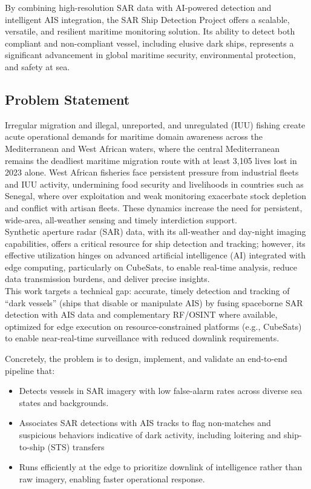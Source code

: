 \documentclass{article}
\begin{document}
	By combining high-resolution SAR data with AI-powered detection and intelligent AIS integration, the SAR Ship Detection Project offers a scalable, versatile, and resilient maritime monitoring solution. Its ability to detect both compliant and non-compliant vessel, including elusive dark ships, represents a significant advancement in global maritime security, environmental protection, and safety at sea.
	
	
	\subsection{Problem Statement}
	
	Irregular migration and illegal, unreported, and unregulated (IUU) fishing create acute operational demands for maritime domain awareness across the Mediterranean and West African waters, where the central Mediterranean remains the deadliest maritime migration route with at least 3,105 lives lost in 2023 alone. West African fisheries face persistent pressure from industrial fleets and IUU activity, undermining food security and livelihoods in countries such as Senegal, where over exploitation and weak monitoring exacerbate stock depletion and conflict with artisan fleets. These dynamics increase the need for persistent, wide-area, all-weather sensing and timely interdiction support.\\
	
	Synthetic aperture radar (SAR) data, with its all-weather and day-night imaging capabilities, offers a critical resource for ship detection and tracking; however, its effective utilization hinges on advanced artificial intelligence (AI) integrated with edge computing, particularly on CubeSats, to enable real-time analysis, reduce data transmission burdens, and deliver precise insights.\\
	
	This work targets a technical gap: accurate, timely detection and tracking of “dark vessels” (ships that disable or manipulate AIS) by fusing spaceborne SAR detection with AIS data and complementary RF/OSINT where available, optimized for edge execution on resource-constrained platforms (e.g., CubeSats) to enable near-real-time surveillance with reduced downlink requirements.
	
	Concretely, the problem is to design, implement, and validate an end-to-end pipeline that:
	\begin{itemize}
		\item Detects vessels in SAR imagery with low false-alarm rates across diverse sea states and backgrounds.
		\item 	Associates SAR detections with AIS tracks to flag non-matches and suspicious behaviors indicative of dark activity, including loitering and ship-to-ship (STS) transfers
		\item Runs efficiently at the edge to prioritize downlink of intelligence rather than raw imagery, enabling faster operational response.
	\end{itemize}
	
\end{document}
